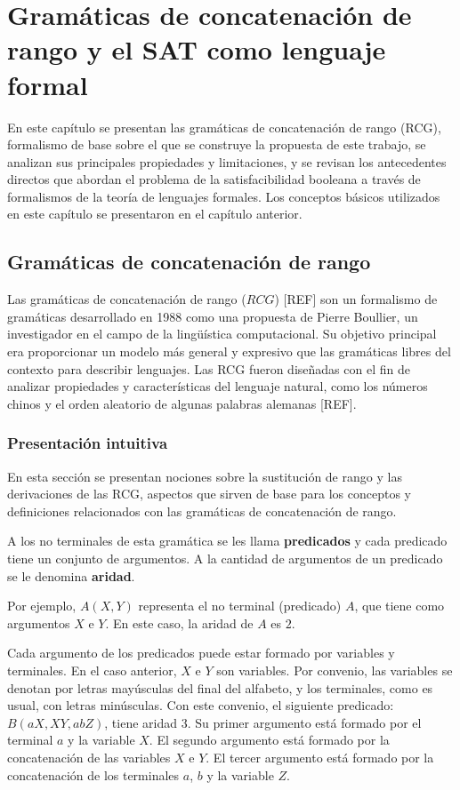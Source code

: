 \documentclass{report}
\theoremstyle{definition}
\theoremstyle{plain}
\theoremstyle{remark}
\begin{document}
\setcounter{chapter}{1}
\chapter{Gramáticas de concatenación de rango y el SAT como lenguaje formal}
\label{cap:rcg-sat}

En este capítulo se presentan las gramáticas de concatenación de rango
(RCG), formalismo de base sobre el que se construye la propuesta de
este trabajo, se analizan sus principales propiedades y limitaciones, y
se revisan los antecedentes directos que abordan el problema de la
satisfacibilidad booleana a través de formalismos de la teoría de
lenguajes formales. Los conceptos básicos utilizados en este capítulo
se presentaron en el capítulo anterior.

\section{Gramáticas de concatenación de rango}
\label{sec:rcg}

Las gramáticas de concatenación de rango ($RCG$) [REF] son
un formalismo de gramáticas desarrollado en 1988 como una propuesta de
Pierre Boullier, un investigador en el campo de la lingüística
computacional. Su objetivo principal era proporcionar un modelo más
general y expresivo que las gramáticas libres del contexto para describir
lenguajes. Las RCG fueron diseñadas con el fin de analizar propiedades y
características del lenguaje natural, como los números chinos y el orden
aleatorio de algunas palabras alemanas [REF].

\subsection{Presentación intuitiva}

En esta sección se presentan nociones sobre la sustitución de rango y las
derivaciones de las RCG, aspectos que sirven de base para los conceptos
y definiciones relacionados con las gramáticas de concatenación de rango.

A los no terminales de esta gramática se les llama \textbf{predicados} y
cada predicado tiene un conjunto de argumentos. A la cantidad de
argumentos de un predicado se le denomina \textbf{aridad}.

Por ejemplo, $A(X, Y)$ representa el no terminal (predicado) $A$, que
tiene como argumentos $X$ e $Y$. En este caso, la aridad de $A$ es $2$.

Cada argumento de los predicados puede estar formado por variables y
terminales. En el caso anterior, $X$ e $Y$ son variables. Por convenio,
las variables se denotan por letras mayúsculas del final del alfabeto, y
los terminales, como es usual, con letras minúsculas. Con este convenio,
el siguiente predicado: $B(aX, XY, abZ)$, tiene aridad $3$. Su primer
argumento está formado por el terminal $a$ y la variable $X$. El segundo
argumento está formado por la concatenación de las variables $X$ e $Y$.
El tercer argumento está formado por la concatenación de los terminales
$a$, $b$ y la variable $Z$.
\end{document}
